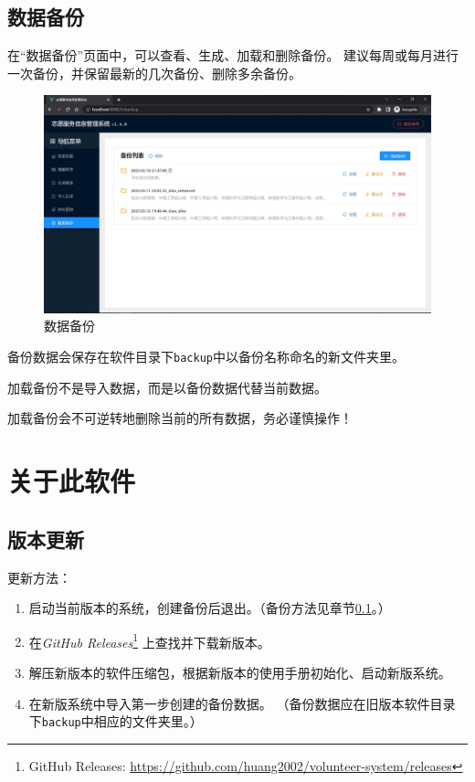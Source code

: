 \documentclass[12pt,titlepage]{article}
\newcommand{\githuburl}{https://github.com/huang2002/volunteer-system}
\newcommand{\releasesurl}{\githuburl/releases}
\begin{document}
\subsection{数据备份}
\label{subsec:backup}

在“数据备份”页面中，可以查看、生成、加载和删除备份。
建议每周或每月进行一次备份，并保留最新的几次备份、删除多余备份。

\begin{figure}[htbp]
    \centering
    \includegraphics[width=\textwidth]{../screenshots/backup.jpg}
    \caption{数据备份}
\end{figure}

备份数据会保存在软件目录下\texttt{backup}中以备份名称命名的新文件夹里。

\begin{warnings}
    \item 加载备份不是导入数据，而是以备份数据代替当前数据。
    \item 加载备份会不可逆转地删除当前的所有数据，务必谨慎操作！
\end{warnings}

\newpage
\section{关于此软件}

\subsection{版本更新}

更新方法：

\begin{enumerate}
    \item 启动当前版本的系统，创建备份后退出。（备份方法见章节\ref{subsec:backup}。）
    \item 在\textit{GitHub Releases}\footnote{GitHub Releases: \url{\releasesurl}}
          上查找并下载新版本。
    \item 解压新版本的软件压缩包，根据新版本的使用手册初始化、启动新版系统。
    \item 在新版系统中导入第一步创建的备份数据。
          （备份数据应在旧版本软件目录下\texttt{backup}中相应的文件夹里。）
\end{enumerate}
\end{document}

